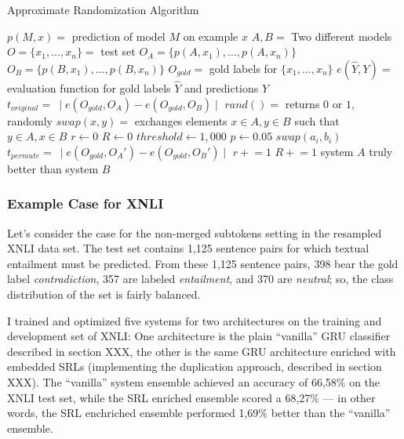 \begin{algorithm}
\caption{Approximate Randomization Algorithm}
\label{alg:approximate-randomization}
	\begin{algorithmic}[1]
    \STATE $p(M,x) =$ prediction of model $M$ on example $x$
    \STATE $A, B =$ Two different models
    \STATE $O = \{x_1, \dotsc, x_n\} =$ test set
    \STATE $O_A = \{p(A,x_1), \dotsc, p(A,x_n)\}$
    \STATE $O_B = \{p(B,x_1), \dotsc, p(B,x_n)\}$
    \STATE $O_{gold} =$ gold labels for $\{x_1, \dotsc, x_n\}$
    \STATE $e(\hat{Y},Y) =$ evaluation function for gold labels $\hat{Y}$ and predictions $Y$
    \STATE $t_{original} =\ \mid e(O_{gold},O_A) - e(O_{gold},O_B) \mid$
    \STATE $rand() =$ returns $0$ or $1$, randomly
    \STATE $swap(x,y) =$ exchanges elements $x \in A,y \in B$ such that $y \in A, x \in B$
    \STATE $r \leftarrow 0$
    \STATE $R \leftarrow 0$
    \STATE $threshold \leftarrow 1,000$
    \STATE $p \leftarrow 0.05$
          \STATE $swap(a_i,b_i)$
        \ENDIF
      \ENDFOR
      \STATE $t_{permute} =\ \mid e(O_{gold},O_A') - e(O_{gold},O_B') \mid$
        \STATE $r \mathrel{+}= 1$
      \ENDIF
      \STATE $R \mathrel{+}= 1$
    \ENDWHILE
      \STATE system $A$ truly better than system $B$
    \ENDIF
  \end{algorithmic}
\end{algorithm}


\subsubsection{Example Case for XNLI}


Let's consider the case for the non-merged subtokens setting in the resampled XNLI data set. The test
set contains 1,125 sentence pairs for which textual entailment must be predicted. From these 1,125
sentence pairs, 398 bear the gold label \emph{contradiction}, 357 are labeled \emph{entailment},
and 370 are \emph{neutral}; so, the class distribution of the set is fairly balanced.

I trained and optimized five systems for two architectures on the training and development set
of XNLI: One architecture is the plain ``vanilla'' GRU classifier described in section XXX, the
other is the same GRU architecture enriched with embedded SRLs (implementing the duplication
approach, described in section XXX). The ``vanilla'' system ensemble achieved an accuracy of
66,58\% on the XNLI test set, while the SRL enriched ensemble scored a 68,27\% --- in other
words, the SRL enchriched ensemble performed 1,69\% better than the ``vanilla'' ensemble.

